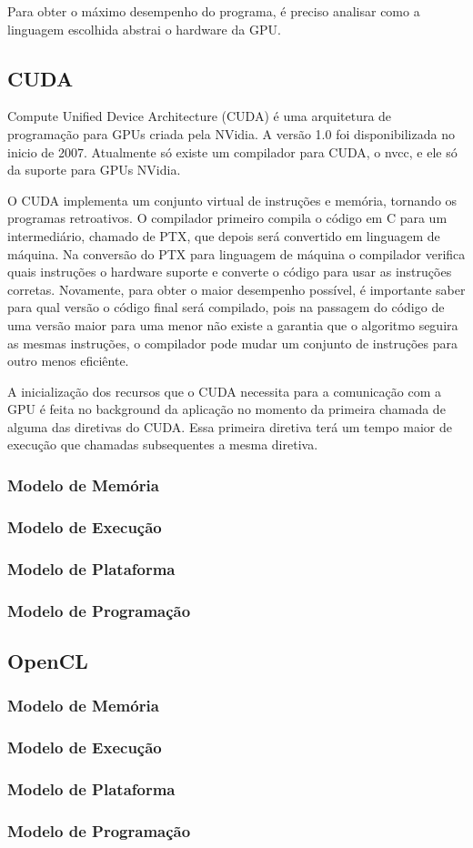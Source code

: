 Para obter o máximo desempenho do programa, é preciso analisar como a linguagem escolhida abstrai o hardware da GPU.

\subsection{CUDA}
Compute Unified Device Architecture (CUDA) é uma arquitetura de programação para GPUs criada pela NVidia.
A versão 1.0 foi disponibilizada no inicio de 2007. Atualmente só existe um compilador para CUDA, o nvcc,
e ele só da suporte para GPUs NVidia.

O CUDA implementa um conjunto virtual de instruções e memória, tornando os programas retroativos. O compilador
primeiro compila o código em C para um intermediário, chamado de PTX, que depois será convertido em linguagem
de máquina. Na conversão do PTX para linguagem de máquina o compilador verifica quais instruções o hardware
suporte e converte o código para usar as instruções corretas. Novamente, para obter o maior desempenho possível,
é importante saber para qual versão o código final será compilado, pois na passagem do código de uma versão
maior para uma menor não existe a garantia que o algoritmo seguira as mesmas instruções, o compilador pode
mudar um conjunto de instruções para outro menos eficiênte.

A inicialização dos recursos que o CUDA necessita para a comunicação com a GPU é feita no background da
aplicação no momento da primeira chamada de alguma das diretivas do CUDA. Essa primeira diretiva terá um
tempo maior de execução que chamadas subsequentes a mesma diretiva.
\subsubsection{Modelo de Memória}

\subsubsection{Modelo de Execução}
\subsubsection{Modelo de Plataforma}
\subsubsection{Modelo de Programação}
\subsection{OpenCL}
\subsubsection{Modelo de Memória}
\subsubsection{Modelo de Execução}
\subsubsection{Modelo de Plataforma}
\subsubsection{Modelo de Programação}
